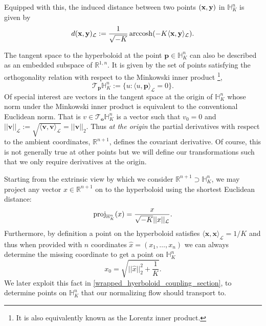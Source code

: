 Equipped with this, the induced distance between two points $(\mathbf{x},\mathbf{y})$ in $\mathbb{H}^{n}_K$ is given by
\begin{equation}
    d(\textbf{x},\textbf{y})_{\mathcal{L}} := \frac{1}{\sqrt{-K}}\operatorname{arccosh}(-K \langle \textbf{x}, \textbf{y} \rangle_{\mathcal{L}}).
\end{equation}

The tangent space to the hyperboloid at the point $\textbf{p} \in \mathbb{H}_K^n$ can also be described as an embedded subspace of $\mathbb{R}^{1,n}$.  
It is given by the set of points satisfying the orthogonality relation with respect to the Minkowski inner product \footnote{It is also equivalently known as the Lorentz inner product.},
\begin{equation}
    \mathcal{T}_{\textbf{p}}\mathbb{H}^n_K := \{u: \langle u, \textbf{p} \rangle_{\mathcal{L}} = 0 \}.
\end{equation}
Of special interest are vectors in the tangent space at the origin of $\mathbb{H}^{n}_K$ whose norm under the Minkowski inner product is equivalent to the conventional Euclidean norm. That is $v \in \mathcal{T}_{\textbf{o}}\mathbb{H}^{n}_K$ is a vector such that $v_0 = 0$ and $||\textbf{v}||_{\mathcal{L}} := \sqrt{\langle \textbf{v}, \textbf{v}
\rangle_{\mathcal{L}}} = ||\textbf{v}||_2$.  Thus \emph{at the origin} the
partial derivatives with respect to the ambient coordinates, $\mathbb{R}^{n+1}$, defines the
covariant derivative.  
Of course, this is not generally true at other points but we will define our transformations such that we only require derivatives at the origin.

Starting from the extrinsic view by which we consider $\mathbb{R}^{n+1} \supset \mathbb{H}^{n}_K$, we may project any vector $x \in \mathbb{R}^{n+1}$ on to the hyperboloid using the shortest Euclidean distance:
\begin{equation}
    \textnormal{proj}_{\mathbb{H}^{n}_K}(x) = \frac{x}{\sqrt{-K}||x||_{\mathcal{L}}}.
\end{equation}
Furthermore, by definition a point on the hyperboloid satisfies $\langle \textbf{x}, \textbf{x} \rangle_{\mathcal{L}} = 1/K$ and thus when provided with $n$ coordinates $\hat{x} = (x_1, \dots, x_{n})$ we can always determine the missing coordinate to get a point on $\mathbb{H}^n_K$
\begin{equation}
    \label{eqn:hyperboloid_projection}
    x_0 = \sqrt{||\hat{x}||^2_2 + \frac{1}{K}}.
\end{equation}
We later exploit this fact in \ref{wrapped_hyerboloid_coupling_section}, to determine points on $\mathbb{H}^n_K$ that our normalizing flow should transport to.

